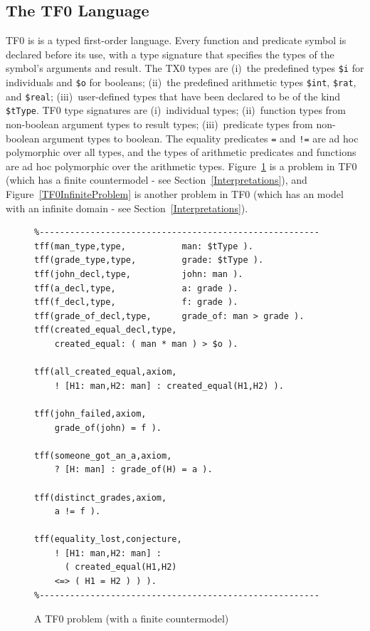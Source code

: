 \documentclass[letterpaper]{article}
\begin{document}
\subsection{The TF0 Language}
\label{TF0}

TF0 is is a typed first-order language.
Every function and predicate symbol is declared before its use, with a type signature that 
specifies the types of the symbol’s arguments and result.
The TX0 types are 
(i)~the predefined types {\tt \$i} for individuals and {\tt \$o} for booleans; 
(ii)~the predefined arithmetic types {\tt \$int}, {\tt \$rat}, and {\tt \$real}; 
(iii)~user-defined types that have been declared to be of the kind {\tt \$tType}.
TF0 type signatures are 
(i)~individual types;
(ii)~function types from non-boolean argument types to result types;
(iii)~predicate types from non-boolean argument types to boolean.
The equality predicates {\tt =} and {\tt !=} are ad hoc polymorphic over all types, and the types 
of arithmetic predicates and functions are ad hoc polymorphic over the arithmetic types.
Figure~\ref{TF0FiniteProblem} is a problem in TF0 (which has a finite countermodel - see 
Section~\ref{Interpretations}), and Figure~\ref{TF0InfiniteProblem} is another problem 
in TF0 (which has an model with an infinite domain - see Section~\ref{Interpretations}).

\begin{figure}[htbp]
\scriptsize
{}
\begin{verbatim}
%-------------------------------------------------------
tff(man_type,type,           man: $tType ).
tff(grade_type,type,         grade: $tType ).
tff(john_decl,type,          john: man ).
tff(a_decl,type,             a: grade ).
tff(f_decl,type,             f: grade ).
tff(grade_of_decl,type,      grade_of: man > grade ).
tff(created_equal_decl,type, 
    created_equal: ( man * man ) > $o ).

tff(all_created_equal,axiom,
    ! [H1: man,H2: man] : created_equal(H1,H2) ).

tff(john_failed,axiom,
    grade_of(john) = f ).

tff(someone_got_an_a,axiom,
    ? [H: man] : grade_of(H) = a ).

tff(distinct_grades,axiom,
    a != f ).

tff(equality_lost,conjecture,
    ! [H1: man,H2: man] :
      ( created_equal(H1,H2)
    <=> ( H1 = H2 ) ) ).
%-------------------------------------------------------
\end{verbatim}
\caption{A TF0 problem (with a finite countermodel)}
\label{TF0FiniteProblem}
\end{figure}
\end{document}

